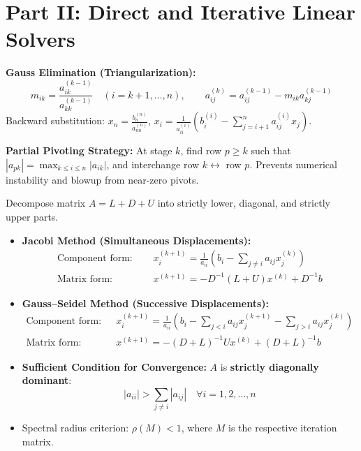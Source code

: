 \section{Part II: Direct and Iterative Linear Solvers}

\begin{theorembox}
\textbf{Gauss Elimination (Triangularization):}
\begin{equation}
    m_{ik} = \frac{a_{ik}^{(k-1)}}{a_{kk}^{(k-1)}} \quad (i = k+1, \dots, n), \qquad a_{ij}^{(k)} = a_{ij}^{(k-1)} - m_{ik} a_{kj}^{(k-1)}
\end{equation}
Backward substitution: $x_n = \frac{b_n^{(n)}}{a_{nn}^{(n)}}$, $x_i = \frac{1}{a_{ii}^{(i)}} \left( b_i^{(i)} - \sum_{j=i+1}^n a_{ij}^{(i)} x_j \right)$.

\textbf{Partial Pivoting Strategy:} At stage $k$, find row $p \ge k$ such that $|a_{pk}| = \max_{k \le i \le n} |a_{ik}|$, and interchange row $k \leftrightarrow$ row $p$. Prevents numerical instability and blowup from near-zero pivots.
\end{theorembox}

\begin{theorembox}
Decompose matrix $A = L + D + U$ into strictly lower, diagonal, and strictly upper parts.
\begin{itemize}[noitemsep]
    \item \textbf{Jacobi Method (Simultaneous Displacements):}
    \begin{align}
        \text{Component form: } \quad & \boxed{x_i^{(k+1)} = \frac{1}{a_{ii}} \left( b_i - \sum_{j \ne i} a_{ij} x_j^{(k)} \right)} \\
        \text{Matrix form: } \quad & \boxed{x^{(k+1)} = -D^{-1}(L + U) x^{(k)} + D^{-1} b}
    \end{align}
    \item \textbf{Gauss--Seidel Method (Successive Displacements):}
    \begin{align}
        \text{Component form: } \quad & \boxed{x_i^{(k+1)} = \frac{1}{a_{ii}} \left( b_i - \sum_{j < i} a_{ij} x_j^{(k+1)} - \sum_{j > i} a_{ij} x_j^{(k)} \right)} \\
        \text{Matrix form: } \quad & \boxed{x^{(k+1)} = -(D+L)^{-1} U x^{(k)} + (D+L)^{-1} b}
    \end{align}
    \item \textbf{Sufficient Condition for Convergence:} $A$ is \textbf{strictly diagonally dominant}:
    \begin{equation}
        \boxed{|a_{ii}| > \sum_{j \ne i} |a_{ij}| \quad \forall i = 1, 2, \dots, n}
    \end{equation}
    \item Spectral radius criterion: $\rho(M) < 1$, where $M$ is the respective iteration matrix.
\end{itemize}
\end{theorembox}

